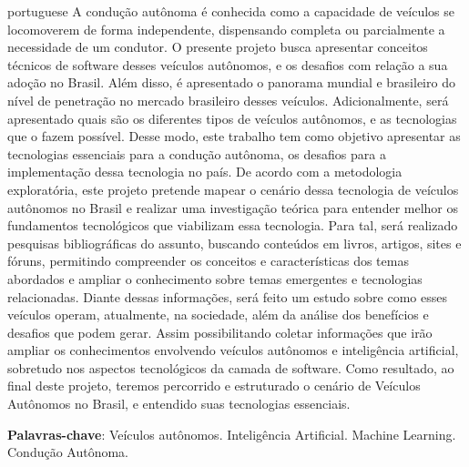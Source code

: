 \documentclass[
	12pt,				%
	openright,			%
	twoside,			%
	a4paper,			%
	english,			%
	french,				%
	spanish,			%
	brazil				%
	]{abntex2}
\begin{document}
\setlength{\absparsep}{18pt} %
\begin{resumo}[Resumo]
	\begin{otherlanguage*}{portuguese}
		A condução autônoma é conhecida como a capacidade de veículos se locomoverem de forma independente, dispensando completa ou parcialmente a necessidade de um condutor.
		O presente projeto busca apresentar conceitos técnicos de software desses veículos autônomos, e os desafios com relação a sua adoção no Brasil. Além disso, é apresentado o panorama mundial e brasileiro do nível de penetração no mercado brasileiro desses veículos. Adicionalmente, será apresentado quais são  os diferentes tipos de veículos autônomos, e as tecnologias que o fazem possível.
		Desse modo, este trabalho tem como objetivo apresentar as tecnologias essenciais para a condução autônoma, os desafios para a implementação dessa tecnologia no país.
		De acordo com a metodologia exploratória, este projeto pretende mapear o cenário dessa tecnologia de veículos autônomos no Brasil e realizar uma investigação teórica para entender melhor os fundamentos tecnológicos que viabilizam essa tecnologia. Para tal, será realizado pesquisas bibliográficas do assunto, buscando conteúdos em livros, artigos, sites e fóruns, permitindo compreender os conceitos e características dos temas abordados e ampliar o conhecimento sobre temas emergentes e tecnologias relacionadas.
		Diante dessas informações, será feito um estudo sobre como esses veículos operam, atualmente, na sociedade, além da análise dos benefícios e desafios que podem gerar. Assim possibilitando coletar informações que irão ampliar os conhecimentos envolvendo veículos autônomos e inteligência artificial, sobretudo nos aspectos tecnológicos da camada de software.
		Como resultado, ao final deste projeto, teremos percorrido e estruturado o cenário de
		Veículos Autônomos no Brasil, e entendido suas tecnologias essenciais.
		\vspace{\onelineskip}

		\noindent
		\textbf{Palavras-chave}: Veículos autônomos. Inteligência Artificial. Machine Learning. Condução Autônoma.
	\end{otherlanguage*}
\end{resumo}
\end{document}
